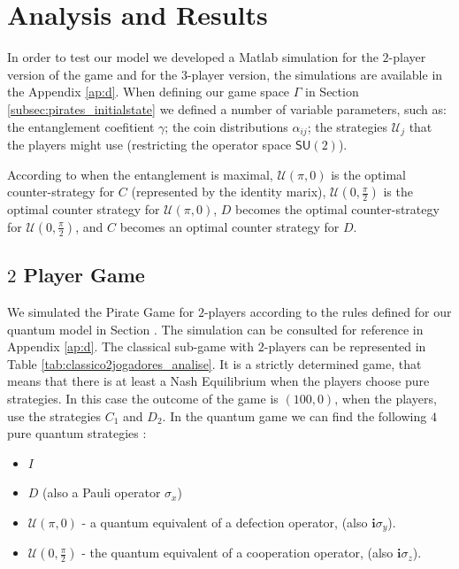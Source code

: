 \section{Analysis and Results}
\label{sec:description_3}


In order to test our model we developed a Matlab simulation for the $2$-player version of the game and for the $3$-player version, the simulations are available in the Appendix \ref{ap:d}. When defining our game space $\Gamma$ in Section \ref{subsec:pirates_initialstate} we defined a number of variable parameters, such as: the entanglement coefitient $\gamma$; the coin distributions $\alpha_{ij}$; the strategies $\mathcal{U}_{j}$ that the players might use (restricting the operator space $\mathsf{SU}(2)$).

According to \cite{Du} when the entanglement is maximal, $\mathcal{U}(\pi, 0)$ is the optimal counter-strategy for $C$ (represented by the identity marix), $\mathcal{U}(0, \frac{\pi}{2})$ is the optimal counter strategy for $\mathcal{U}(\pi, 0)$, $D$ becomes the optimal counter-strategy for $\mathcal{U}(0, \frac{\pi}{2})$, and $C$ becomes an optimal counter strategy for $D$. 

\subsection{$2$ Player Game}
\label{subsec:2playergame}

We simulated the Pirate Game for $2$-players according to the rules defined for our quantum model in Section . The simulation can be consulted for reference in Appendix \ref{ap:d}. The classical sub-game with $2$-players can be represented in Table \ref{tab:classico2jogadores_analise}. It is a strictly determined game, that means that there is at least a Nash Equilibrium when the players choose pure strategies\cite{Leyton-Brown2008:Essentials_Game_Theory}. In this case the outcome of the game is $(100, 0)$, when the players, use the strategies $C_{1}$ and $D_{2}$.  In the quantum game we can find the following $4$ pure quantum strategies :

\begin{itemize}

\item $I$

\item $D$ (also a Pauli operator $\sigma_{x}$)

\item $\mathcal{U}( \pi, 0)$ - a quantum equivalent of a defection operator, (also $\mathbf{i}\sigma_y$).

\item $\mathcal{U}( 0, \frac{\pi}{2})$ - the quantum equivalent of a cooperation operator, (also $\mathbf{i}\sigma_z$).

\end{itemize}

